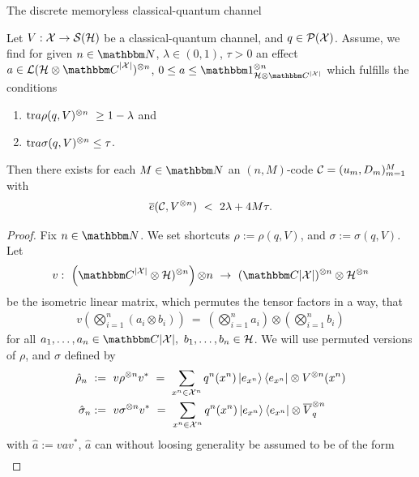 \begin{section}{The discrete memoryless  classical-quantum channel}
      \begin{proposition} \label{prop:coding_from_stein}
       Let $V: {\mathcal X} \rightarrow {\mathcal S}({\mathcal H})$ be a classical-quantum channel, and $q \in {\mathcal P}({\mathcal X})$. Assume, we find for given $n \in \bbmN$, $\lambda \in (0,1)$, $\tau > 0$ an effect $a \in \cL(\cH \otimes \bbmC^{|\cX|})^{\otimes n}$, 
       $0 \leq a \leq \bbmeins_{\cH \otimes \bbmC^{|\cX|}}^{\otimes n}$ which fulfills the conditions
       \begin{enumerate}
        \item $\mathrm{tr} a \rho(q,V)^{\otimes n} \ \geq 1 - \lambda$ and 
        \item $\mathrm{tr} a \sigma(q,V)^{\otimes n} \leq \tau$. 
       \end{enumerate}
	Then there exists for each $M \in \bbmN$ an $(n,M)$-code ${\mathcal C} = (u_m, D_m)_{m=1}^M$ with
	\begin{align*}
	 \overline{e}({\mathcal C}, V^{\otimes n}) \ < \ 2 \lambda + 4M\tau.
	\end{align*}
      \end{proposition}
      \begin{proof}
      Fix $n \in \bbmN$. We set shortcuts $\rho:= \rho(q,V)$, and $\sigma := \sigma(q,V)$. Let 
      \begin{align*}
          v: \ \left(\bbmC^{|\cX|} \otimes \cH)^{\otimes n}\right){\otimes n} \ \rightarrow \ (\bbmC{|\cX|})^{\otimes n} \otimes \cH^{\otimes n} 
      \end{align*}
	be the isometric linear matrix, which permutes the tensor factors in a way, that 
      \begin{align*}
		v\left(\bigotimes_{i=1}^{n}(a_i \otimes b_i)\right) \ = \ \left(\bigotimes_{i=1}^n a_i \right) \otimes \left( \bigotimes_{i=1}^n b_i \right)
      \end{align*}
      for all $a_1,\dots,a_n \in \bbmC{|\cX|}, \ b_1,\dots,b_n \in \cH$. We will use permuted versions of $\rho$, and $\sigma$ defined by 
      \begin{align*}
       \hat{\rho}_n \ 
       &:= \ v \rho^{\otimes n} v^\ast \ = \ \sum_{x^n \in \cX^n} q^n(x^n)  \ket{e_{x^n}}\bra{e_{x^n}} \otimes  V^{\otimes n}(x^n) \\
       \hat{\sigma}_n 
       &:= \ v \sigma^{\otimes n} v^\ast \ = \ \sum_{x^n \in \cX^n} q^n(x^n)  \ket{e_{x^n}}\bra{e_{x^n}} \otimes  \overline{V}_q^{\otimes n} 
      \end{align*}
      with $\hat{a} := vav^\ast$, $\hat{a}$ can without loosing generality be assumed to be of the form
      \begin{align}

\end{align}
\end{proof}
\end{section}
